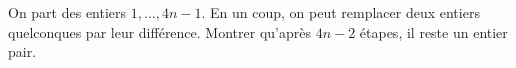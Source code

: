 On part des entiers $1, \ldots, 4n - 1$. En un coup, on peut remplacer deux entiers quelconques par leur différence. Montrer qu'après $4n - 2$ étapes, il reste un entier pair.
